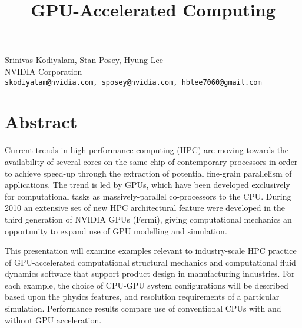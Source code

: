 \title{GPU-Accelerated Computing}
\author{} \institute{}
\maketitle

\begin{center}
{\large \underline{Srinivas Kodiyalam}, Stan Posey, Hyung Lee}\\
NVIDIA Corporation\\
{\tt skodiyalam@nvidia.com, sposey@nvidia.com, hblee7060@gmail.com}
\end{center}

\section*{Abstract}
Current trends in high performance computing (HPC) are moving towards the availability of several cores on the same chip of contemporary processors in order to achieve speed-up through the extraction of potential fine-grain parallelism of applications. The trend is led by GPUs, which have been developed exclusively for computational tasks as massively-parallel co-processors to the CPU. During 2010 an extensive set of new HPC architectural feature were developed in the third generation of NVIDIA GPUs (Fermi), giving computational mechanics an opportunity to expand use of GPU modelling and simulation.

This presentation will examine examples relevant to industry-scale HPC practice of GPU-accelerated computational structural mechanics and computational fluid dynamics software that support product design in manufacturing industries. For each example, the choice of CPU-GPU system configurations will be described based upon the physics features, and resolution requirements of a particular simulation. Performance results compare use of conventional CPUs with and without GPU acceleration.

